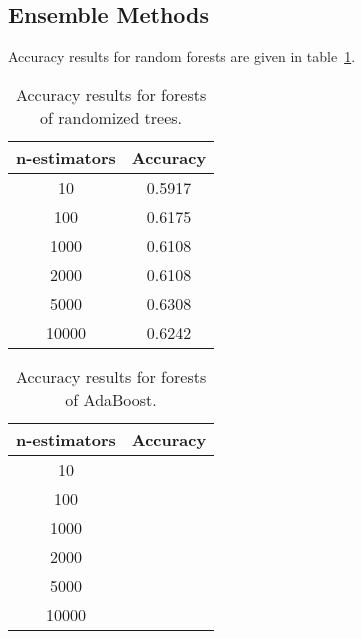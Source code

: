 \documentclass[a4paper]{llncs}
\begin{document}
\subsection{Ensemble Methods}
Accuracy results for random forests are given in table~\ref{table:RandomForests}.
\begin{table}[!htbp]
\centering
\begin{tabular}{|c|c|}
\hline
\multicolumn{1}{|l|}{n-estimators} & \multicolumn{1}{l|}{Accuracy} \\ \hline
10                                 &           0.5917                    \\ \hline
100                                &           0.6175                    \\ \hline
1000                               &           0.6108                    \\ \hline
2000                               &           0.6108                    \\ \hline
5000                               &           0.6308                    \\ \hline
10000                              &           0.6242                    \\ \hline
\end{tabular}
\caption{Accuracy results for forests of randomized trees.}
\label{table:RandomForests}
\end{table}

\begin{table}[!htbp]
\centering
\begin{tabular}{|c|c|}
\hline
\multicolumn{1}{|l|}{n-estimators} & \multicolumn{1}{l|}{Accuracy} \\ \hline
10                                 &                               \\ \hline
100                                &                               \\ \hline
1000                               &                               \\ \hline
2000                               &                               \\ \hline
5000                               &                               \\ \hline
10000                              &                               \\ \hline
\end{tabular}
\caption{Accuracy results for forests of AdaBoost.}
\label{table:AdaBoost}
\end{table}
\end{document}
